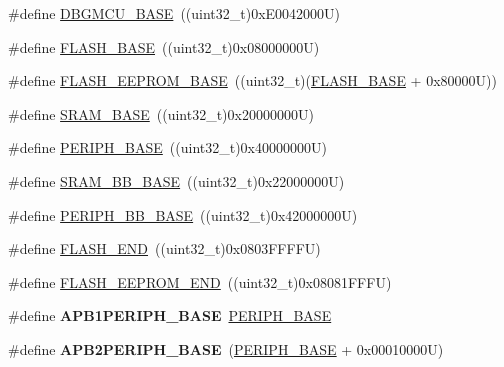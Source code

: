 \begin{DoxyCompactItemize}
\item 
\#define \hyperlink{group___peripheral__memory__map_ga4adaf4fd82ccc3a538f1f27a70cdbbef}{D\-B\-G\-M\-C\-U\-\_\-\-B\-A\-S\-E}~((uint32\-\_\-t)0x\-E0042000\-U)
\item 
\#define \hyperlink{group___peripheral__memory__map_ga23a9099a5f8fc9c6e253c0eecb2be8db}{F\-L\-A\-S\-H\-\_\-\-B\-A\-S\-E}~((uint32\-\_\-t)0x08000000\-U)
\item 
\#define \hyperlink{group___peripheral__memory__map_ga45b9071c81cb72a66e2e3195343fcb3a}{F\-L\-A\-S\-H\-\_\-\-E\-E\-P\-R\-O\-M\-\_\-\-B\-A\-S\-E}~((uint32\-\_\-t)(\hyperlink{group___peripheral__memory__map_ga23a9099a5f8fc9c6e253c0eecb2be8db}{F\-L\-A\-S\-H\-\_\-\-B\-A\-S\-E} + 0x80000\-U))
\item 
\#define \hyperlink{group___peripheral__memory__map_ga05e8f3d2e5868754a7cd88614955aecc}{S\-R\-A\-M\-\_\-\-B\-A\-S\-E}~((uint32\-\_\-t)0x20000000\-U)
\item 
\#define \hyperlink{group___peripheral__memory__map_ga9171f49478fa86d932f89e78e73b88b0}{P\-E\-R\-I\-P\-H\-\_\-\-B\-A\-S\-E}~((uint32\-\_\-t)0x40000000\-U)
\item 
\#define \hyperlink{group___peripheral__memory__map_gad3548b6e2f017f39d399358f3ac98454}{S\-R\-A\-M\-\_\-\-B\-B\-\_\-\-B\-A\-S\-E}~((uint32\-\_\-t)0x22000000\-U)
\item 
\#define \hyperlink{group___peripheral__memory__map_gaed7efc100877000845c236ccdc9e144a}{P\-E\-R\-I\-P\-H\-\_\-\-B\-B\-\_\-\-B\-A\-S\-E}~((uint32\-\_\-t)0x42000000\-U)
\item 
\#define \hyperlink{group___peripheral__memory__map_ga8be554f354e5aa65370f6db63d4f3ee4}{F\-L\-A\-S\-H\-\_\-\-E\-N\-D}~((uint32\-\_\-t)0x0803\-F\-F\-F\-F\-U)
\item 
\#define \hyperlink{group___peripheral__memory__map_gac8cb9b66893a7c4bdff3258909af027a}{F\-L\-A\-S\-H\-\_\-\-E\-E\-P\-R\-O\-M\-\_\-\-E\-N\-D}~((uint32\-\_\-t)0x08081\-F\-F\-F\-U)
\item 
\hypertarget{group___peripheral__memory__map_ga45666d911f39addd4c8c0a0ac3388cfb}{\#define {\bfseries A\-P\-B1\-P\-E\-R\-I\-P\-H\-\_\-\-B\-A\-S\-E}~\hyperlink{group___peripheral__memory__map_ga9171f49478fa86d932f89e78e73b88b0}{P\-E\-R\-I\-P\-H\-\_\-\-B\-A\-S\-E}}\label{group___peripheral__memory__map_ga45666d911f39addd4c8c0a0ac3388cfb}

\item 
\hypertarget{group___peripheral__memory__map_ga25b99d6065f1c8f751e78f43ade652cb}{\#define {\bfseries A\-P\-B2\-P\-E\-R\-I\-P\-H\-\_\-\-B\-A\-S\-E}~(\hyperlink{group___peripheral__memory__map_ga9171f49478fa86d932f89e78e73b88b0}{P\-E\-R\-I\-P\-H\-\_\-\-B\-A\-S\-E} + 0x00010000\-U)}\label{group___peripheral__memory__map_ga25b99d6065f1c8f751e78f43ade652cb}


\end{DoxyCompactItemize}
